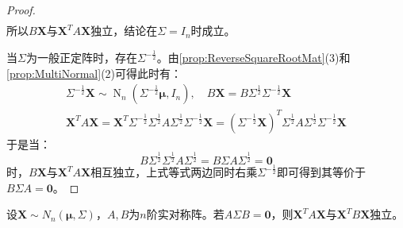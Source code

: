 \begin{proof}
\begin{gather*}
	\end{gather*}
	所以$B\mathbf{X}$与$\mathbf{X}^TA\mathbf{X}$独立，结论在$\Sigma=I_n$时成立。\par
	当$\Sigma$为一般正定阵时，存在$\Sigma^{-\frac{1}{2}}$。由\cref{prop:ReverseSquareRootMat}(3)和\cref{prop:MultiNormal}(2)可得此时有：
	\begin{gather*}
		\Sigma^{-\frac{1}{2}}\mathbf{X}\sim\operatorname{N}_n(\Sigma^{-\frac{1}{2}}\boldsymbol{\mu},I_n),\quad B\mathbf{X}=B\Sigma^{\frac{1}{2}}\Sigma^{-\frac{1}{2}}\mathbf{X} \\
		\mathbf{X}^TA\mathbf{X}=\mathbf{X}^T\Sigma^{-\frac{1}{2}}\Sigma^{\frac{1}{2}}A\Sigma^{\frac{1}{2}}\Sigma^{-\frac{1}{2}}\mathbf{X}=(\Sigma^{-\frac{1}{2}}\mathbf{X})^T\Sigma^{\frac{1}{2}}A\Sigma^{\frac{1}{2}}\Sigma^{-\frac{1}{2}}\mathbf{X}
	\end{gather*}
	于是当：
	\begin{equation*}
		B\Sigma^{\frac{1}{2}}\Sigma^{\frac{1}{2}}A\Sigma^{\frac{1}{2}}=B\Sigma A\Sigma^{\frac{1}{2}}=\mathbf{0}
	\end{equation*}
	时，$B\mathbf{X}$与$\mathbf{X}^TA\mathbf{X}$相互独立，上式等式两边同时右乘$\Sigma^{-\frac{1}{2}}$即可得到其等价于$B\Sigma A=\mathbf{0}$。
\end{proof}
\begin{theorem}\label{theo:XAXXBXIndependent}
	设$\mathbf{X}\sim N_n(\boldsymbol{\mu},\Sigma)$，$A,B$为$n$阶实对称阵。若$A\Sigma B=\mathbf{0}$，则$\mathbf{X}^TA\mathbf{X}$与$\mathbf{X}^TB\mathbf{X}$独立。
\end{theorem}
